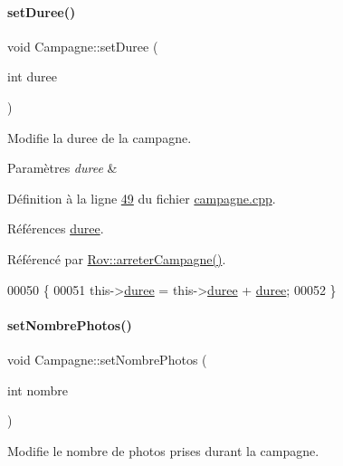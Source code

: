 \paragraph{\texorpdfstring{set\+Duree()}{setDuree()}}
{\footnotesize\ttfamily void Campagne\+::set\+Duree (\begin{DoxyParamCaption}\item[{int}]{duree }\end{DoxyParamCaption})}



Modifie la duree de la campagne. 


\begin{DoxyParams}{Paramètres}
{\em duree} & \\
\hline
\end{DoxyParams}


Définition à la ligne \hyperlink{campagne_8cpp_source_l00049}{49} du fichier \hyperlink{campagne_8cpp_source}{campagne.\+cpp}.



Références \hyperlink{campagne_8h_source_l00044}{duree}.



Référencé par \hyperlink{rov_8cpp_source_l00136}{Rov\+::arreter\+Campagne()}.


\begin{DoxyCode}
00050 \{
00051     this->\hyperlink{class_campagne_a4fb4cb286275103c9b6946e25e301fbf}{duree} = this->\hyperlink{class_campagne_a4fb4cb286275103c9b6946e25e301fbf}{duree} + \hyperlink{class_campagne_a4fb4cb286275103c9b6946e25e301fbf}{duree};
00052 \}
\end{DoxyCode}
\mbox{\label{class_campagne_a2b8848ade0f97708571331ef71e4c9cb}} 
\paragraph{\texorpdfstring{set\+Nombre\+Photos()}{setNombrePhotos()}}
{\footnotesize\ttfamily void Campagne\+::set\+Nombre\+Photos (\begin{DoxyParamCaption}\item[{int}]{nombre }\end{DoxyParamCaption})}



Modifie le nombre de photos prises durant la campagne. 


